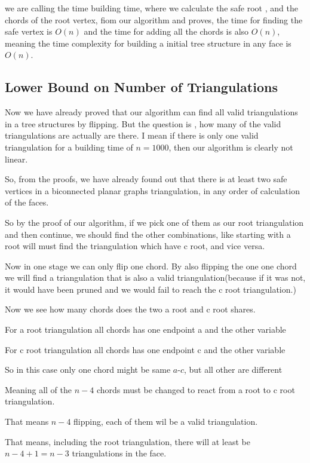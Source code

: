 \documentclass[12pt,a4paper]{article}
\begin{document}
we are calling the time building time, where we calculate the safe root , and the chords of the root vertex, fiom our algorithm and proves, the time for finding the safe vertex is $O(n)$ and the time for adding all the chords is also $O(n)$, meaning the time complexity for building a initial tree structure in any face is $O(n)$.

\subsection{Lower Bound on Number of Triangulations}

Now we have already proved that our algorithm can find all valid triangulations in a tree structures by flipping. But the question is , how many of the valid triangulations are actually are there. I mean if there is only one valid triangulation for a building time of $n=1000$, then our algorithm is clearly not linear.

So, from the proofs, we have already found out that there is at least two safe vertices in a biconnected planar graphs triangulation, in any order of calculation of the faces. 

So by the proof of our algorithm, if we pick one of them as our root triangulation and then continue, we should find the other combinations, like starting with a root will must find the triangulation which have c root, and vice versa. 

Now in one stage we can only flip one chord. By also flipping the one one chord we will find a triangulation that is also a valid triangulation(because if it was not, it would have been pruned and we would fail to reach the c root triangulation.)

Now we see how many chords does the two a root and c root shares. 

For a root triangulation all chords has one endpoint a and the other variable

For c root triangulation all chords has one endpoint c and the other variable

So in this case only one chord might be same $a$-$c$, but all other are different

Meaning all of the $n-4$ chords must be changed to react from a root to c root triangulation.

That means $n - 4$ flipping, each of them wil be a valid triangulation.

That means, including the root triangulation, there will at least be $n - 4 + 1 = n - 3$ triangulations in the face. 
\end{document}
